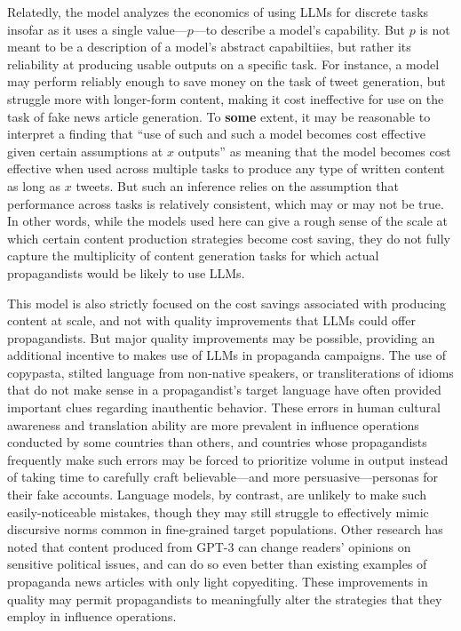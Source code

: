 \documentclass{article}
\begin{document}
Relatedly, the model analyzes the economics of using LLMs for discrete tasks insofar as it uses a single value—$p$—to describe a model's capability. But $p$ is not meant to be a description of a model's abstract capabiltiies, but rather its reliability at producing usable outputs on a specific task. For instance, a model may perform reliably enough to save money on the task of tweet generation, but struggle more with longer-form content, making it cost ineffective for use on the task of fake news article generation. To \textbf{some} extent, it may be reasonable to interpret a finding that ``use of such and such a model becomes cost effective given certain assumptions at $x$ outputs'' as meaning that the model becomes cost effective when used across multiple tasks to produce any type of written content as long as $x$ tweets. But such an inference relies on the assumption that performance across tasks is relatively consistent, which may or may not be true. In other words, while the models used here can give a rough sense of the scale at which certain content production strategies become cost saving, they do not fully capture the multiplicity of content generation tasks for which actual propagandists would be likely to use LLMs. 

This model is also strictly focused on the cost savings associated with producing content at scale, and not with quality improvements that LLMs could offer propagandists. But major quality improvements may be possible, providing an additional incentive to makes use of LLMs in propaganda campaigns. The use of copypasta, stilted language from non-native speakers, or transliterations of idioms that do not make sense in a propagandist's target language have often provided important clues regarding inauthentic behavior. \cite{siochina, graphika, bjp} These errors in human cultural awareness and translation ability are more prevalent in influence operations conducted by some countries than others, and countries whose propagandists frequently make such errors may be forced to prioritize volume in output instead of taking time to carefully craft believable—and more persuasive—personas for their fake accounts. \cite{chinatwitter, dragonbridge} Language models, by contrast, are unlikely to make such easily-noticeable mistakes, though they may still struggle to effectively mimic discursive norms common in fine-grained target populations. \cite{gpt3, CSETreport, sedova2} Other research has noted that content produced from GPT-3 can change readers' opinions on sensitive political issues, and can do so even better than existing examples of propaganda news articles with only light copyediting. \cite{surveyresearch} These improvements in quality may permit propagandists to meaningfully alter the strategies that they employ in influence operations. \cite{workshop}
\end{document}

